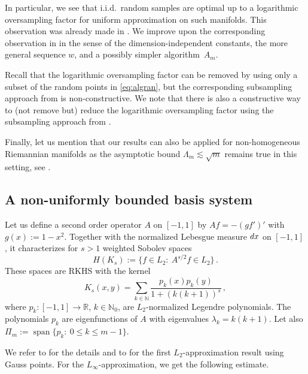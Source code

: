 \documentclass[a4paper,12pt]{amsart}
\theoremstyle{definition}
\theoremstyle{remark}
\begin{document}
{In particular, we see that i.i.d.\ random samples are optimal up to a logarithmic oversampling factor for uniform approximation on such manifolds. This observation was already made in \cite{KSmani}. We improve upon the corresponding observation in \cite{KSmani} in the sense of the dimension-independent constants, the more general sequence $w$, and a possibly simpler algorithm~$A_m$.

Recall that the logarithmic oversampling factor can be removed by using only a subset of the random points in \eqref{eq:algran}, but the corresponding subsampling approach from \cite{DKU} is non-constructive.
We note that there is also a constructive way to (not remove but) reduce the logarithmic oversampling factor using the subsampling approach from \cite{BSU}.



Finally, let us mention that our results can also be applied for non-homogeneous Riemannian manifolds as the asymptotic bound $\Lambda_m \lesssim \sqrt{m}$ remains true in this setting, see \cite[Lemma~5.2]{Mhaskar2}.





\subsection{A non-uniformly bounded basis system} \label{ex:unbounded}

{Let us} define a second order operator $A$ on $[-1,1]$  by
  {$Af = - (gf')'$ with $g(x):=1-x^2$}. 
Together with the %
{normalized Lebesgue measure}
$\rm d x$ on $[-1,1]$, it
characterizes for $s>1$ weighted Sobolev spaces
\begin{equation*}%
H(K_s) := \{ f\in L_2\colon \  A^{s/2}f \in L_2 \}\,.
\end{equation*}
These spaces are RKHS with the kernel
$$
K_s(x,y) = \sum_{k\in \mathbb{N}} \frac{{p}_k(x)  {p}_k(y)}{ 1+ (k(k+1))^s  } \,,
$$
where ${p}_k\colon [-1,1] \rightarrow \mathbb{R}$, $k \in 
{\mathbb{N}_0}$, are
$L_2$-normalized Legendre polynomials.  The polynomials $p_k$ are eigenfunctions of $A$ with eigenvalues $\lambda_k=k(k+1)$.
 {Let also $\Pi_m := \operatorname{span}\{p_k\colon \ 0\leq k\leq m-1 \}$.}


We refer to 
{\cite[Section 5]{Chernov_Dung2016} for the details}
{and to \cite{Bernardi_Maday1992}} for
the first $L_2$-approximation result 
using
Gauss points.  {For the $L_{\infty}$-approximation, we get the following estimate.}



}
\end{document}
